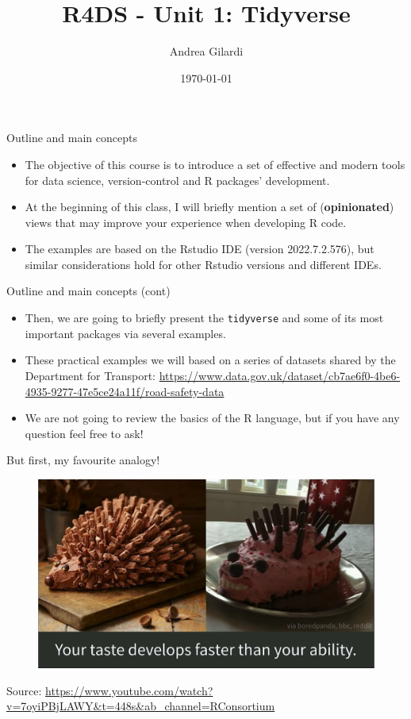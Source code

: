 \documentclass[
hyperref={bookmarks=false},
xcolor={dvipsnames,svgnames*,x11names*}, 
12pt
]{beamer}
\title{R4DS - Unit 1: Tidyverse}
\author{Andrea Gilardi}
\date{\today}
\begin{document}
\inserttitlepage

\begin{frame}{Outline and main concepts}
\vspace{-0.5cm}
\begin{itemize}
\itemsep 3ex
\item The objective of this course is to introduce a set of effective and modern tools for data science, version-control and R packages' development. 
\item At the beginning of this class, I will briefly mention a set of (\textbf{opinionated}) views that may improve your experience when developing R code. 
\item The examples are based on the Rstudio IDE (version 2022.7.2.576), but similar considerations hold for other Rstudio versions and different IDEs. 
\end{itemize}
\end{frame}

\begin{frame}{Outline and main concepts (cont)}
\vspace{-0.5cm}
\begin{itemize}
\itemsep 3ex
\item Then, we are going to briefly present the \texttt{tidyverse} and some of its most important packages via several examples. 
\item These practical examples we will based on a series of datasets shared by the Department for Transport: \url{https://www.data.gov.uk/dataset/cb7ae6f0-4be6-4935-9277-47e5ce24a11f/road-safety-data}
\item We are not going to review the basics of the R language, but if you have any question feel free to ask! 
\end{itemize}
\end{frame}

\begin{frame}{But first, my favourite analogy!}
\vspace{-0.35cm}
\begin{figure}
\centering
\includegraphics[width=0.95\linewidth]{figures/hedgehog.png}
\end{figure}
Source: \url{https://www.youtube.com/watch?v=7oyiPBjLAWY&t=448s&ab_channel=RConsortium}
\end{frame}
\end{document}
